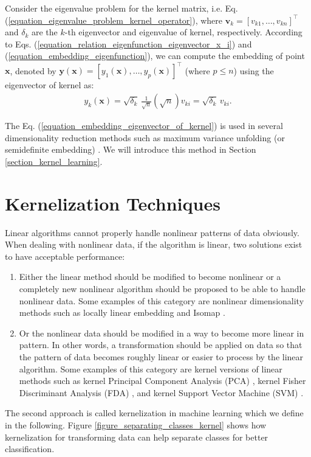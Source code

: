 \documentclass[lang=cn,10pt]{gorgeousnbook}
\numberwithin{equation}{section}%
\numberwithin{figure}{section}%
\begin{document}
\begin{corollary}
Consider the eigenvalue problem for the kernel matrix, i.e. Eq. (\ref{equation_eigenvalue_problem_kernel_operator}), where $\boldsymbol{v}_k = [v_{k1}, \dots, v_{kn}]^\top$ and $\delta_k$ are the $k$-th eigenvector and eigenvalue of kernel, respectively. According to Eqs. (\ref{equation_relation_eigenfunction_eigenvector_x_i}) and (\ref{equation_embedding_eigenfunction}), we can compute the embedding of point $\boldsymbol{x}$, denoted by $\boldsymbol{y}(\boldsymbol{x}) = [y_1(\boldsymbol{x}), \dots, y_p(\boldsymbol{x})]^\top$ (where $p \leq n$) using the eigenvector of kernel as:
\begin{align}\label{equation_embedding_eigenvector_of_kernel}
y_k(\boldsymbol{x}) = \sqrt{\delta_k}\, \frac{1}{\sqrt{n}} (\sqrt{n}) v_{ki} = \sqrt{\delta_k}\, v_{ki}. 
\end{align}
\end{corollary}
The Eq. (\ref{equation_embedding_eigenvector_of_kernel}) is used in several dimensionality reduction methods such as maximum variance unfolding (or semidefinite embedding) \cite{weinberger2005nonlinear,weinberger2006unsupervised,weinberger2006introduction}. We will introduce this method in Section \ref{section_kernel_learning}. 

\section{Kernelization Techniques}\label{section_kernelization_techniques}

Linear algorithms cannot properly handle nonlinear patterns of data obviously. 
When dealing with nonlinear data, if the algorithm is linear, two solutions exist to have acceptable performance:
\begin{enumerate}
\item Either the linear method should be modified to become nonlinear or a completely new nonlinear algorithm should be proposed to be able to handle nonlinear data. Some examples of this category are nonlinear dimensionality methods such as locally linear embedding \cite{ghojogh2020locally} and Isomap \cite{ghojogh2020multidimensional}. 
\item Or the nonlinear data should be modified in a way to become more linear in pattern. In other words, a transformation should be applied on data so that the pattern of data becomes roughly linear or easier to process by the linear algorithm. Some examples of this category are kernel versions of linear methods such as kernel Principal Component Analysis (PCA) \cite{scholkopf1997kernel,scholkopf1998nonlinear,ghojogh2019unsupervised}, kernel Fisher Discriminant Analysis (FDA) \cite{mika1999fisher,ghojogh2019fisher}, and kernel Support Vector Machine (SVM) \cite{boser1992training,vapnik1995nature}. 
\end{enumerate}
The second approach is called kernelization in machine learning which we define in the following. 
Figure \ref{figure_separating_classes_kernel} shows how kernelization for transforming data can help separate classes for better classification. 
\end{document}
